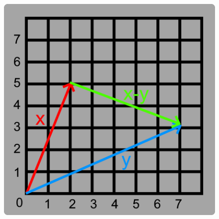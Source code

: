     \begin{figure}[h]
        \centering
        \includegraphics[scale=0.4]{Images/1.1.1.png}   
    \end{figure}




